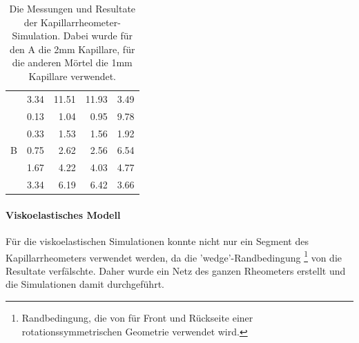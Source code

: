 \begin{table}[bt]
\begin{tabular}{l r r r r}
                                  & 3.34 & 11.51 & 11.93  & 3.49\\
        \cmidrule(lr){1-2}
        \cmidrule(lr){3-4}
        \cmidrule(lr){5-5}
        \multirow{5}{*}{\moertelB{} B}  & 0.13 & 1.04 & 0.95 &  9.78\\
                                  & 0.33 & 1.53 & 1.56 &  1.92\\
                                  & 0.75 & 2.62 & 2.56 &  6.54\\
                                  & 1.67 & 4.22 & 4.03 &  4.77\\
                                  & 3.34 & 6.19 & 6.42 &  3.66\\
        \bottomrule[1.5pt]
    \end{tabular}
    \caption{Die Messungen und Resultate der Kapillarrheometer-Simulation. Dabei wurde für den \moertelA{} A die 2mm Kapillare, für die anderen Mörtel die 1mm Kapillare verwendet.}
    \label{fig:kapRheoResults}
\end{table}

\paragraph{Viskoelastisches Modell}
Für die viskoelastischen Simulationen konnte nicht nur ein Segment des Kapillarrheometers verwendet werden, da die 'wedge'-Randbedingung \footnote{Randbedingung, die von \openfoam{} für Front und Rückseite einer rotationssymmetrischen Geometrie verwendet wird.} von \openfoam{} die Resultate verfälschte. Daher wurde ein Netz des ganzen Rheometers erstellt und die Simulationen damit durchgeführt.

